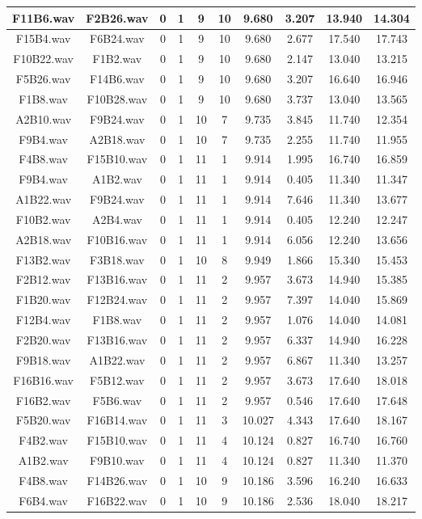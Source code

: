\documentclass[11pt,a4paper]{book}
\begin{document}
\begin{longtable}[c]{|c|c|c|c|c|c|c|c|c|c|}
F11B6.wav&F2B26.wav&0&1&9&10&9.680&3.207&13.940&14.304\\ \hline
F15B4.wav&F6B24.wav&0&1&9&10&9.680&2.677&17.540&17.743\\ \hline
F10B22.wav&F1B2.wav&0&1&9&10&9.680&2.147&13.040&13.215\\ \hline
F5B26.wav&F14B6.wav&0&1&9&10&9.680&3.207&16.640&16.946\\ \hline
F1B8.wav&F10B28.wav&0&1&9&10&9.680&3.737&13.040&13.565\\ \hline
A2B10.wav&F9B24.wav&0&1&10&7&9.735&3.845&11.740&12.354\\ \hline
F9B4.wav&A2B18.wav&0&1&10&7&9.735&2.255&11.740&11.955\\ \hline
F4B8.wav&F15B10.wav&0&1&11&1&9.914&1.995&16.740&16.859\\ \hline
F9B4.wav&A1B2.wav&0&1&11&1&9.914&0.405&11.340&11.347\\ \hline
A1B22.wav&F9B24.wav&0&1&11&1&9.914&7.646&11.340&13.677\\ \hline
F10B2.wav&A2B4.wav&0&1&11&1&9.914&0.405&12.240&12.247\\ \hline
A2B18.wav&F10B16.wav&0&1&11&1&9.914&6.056&12.240&13.656\\ \hline
F13B2.wav&F3B18.wav&0&1&10&8&9.949&1.866&15.340&15.453\\ \hline
F2B12.wav&F13B16.wav&0&1&11&2&9.957&3.673&14.940&15.385\\ \hline
F1B20.wav&F12B24.wav&0&1&11&2&9.957&7.397&14.040&15.869\\ \hline
F12B4.wav&F1B8.wav&0&1&11&2&9.957&1.076&14.040&14.081\\ \hline
F2B20.wav&F13B16.wav&0&1&11&2&9.957&6.337&14.940&16.228\\ \hline
F9B18.wav&A1B22.wav&0&1&11&2&9.957&6.867&11.340&13.257\\ \hline
F16B16.wav&F5B12.wav&0&1&11&2&9.957&3.673&17.640&18.018\\ \hline
F16B2.wav&F5B6.wav&0&1&11&2&9.957&0.546&17.640&17.648\\ \hline
F5B20.wav&F16B14.wav&0&1&11&3&10.027&4.343&17.640&18.167\\ \hline
F4B2.wav&F15B10.wav&0&1&11&4&10.124&0.827&16.740&16.760\\ \hline
A1B2.wav&F9B10.wav&0&1&11&4&10.124&0.827&11.340&11.370\\ \hline
F4B8.wav&F14B26.wav&0&1&10&9&10.186&3.596&16.240&16.633\\ \hline
F6B4.wav&F16B22.wav&0&1&10&9&10.186&2.536&18.040&18.217\\ \hline

\end{longtable}
\end{document}
